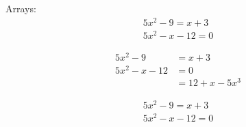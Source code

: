 \documentclass[11pt]{article}
\begin{document}
Arrays:
\begin{align}
5x^2 - 9 = x + 3\\
5x^2 - x - 12 = 0
\end{align}

\begin{align*}
5x^2 - 9 &= x + 3\\
5x^2 - x - 12 &= 0\\
&=12 + x - 5x^3
\end{align*}

\begin{align}
5x^2 - 9 = x + 3\\
5x^2 - x - 12 = 0
\end{align}
\end{document}
